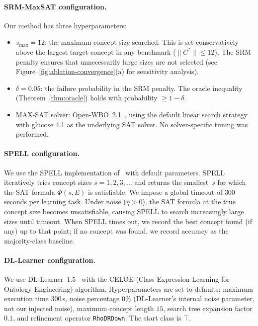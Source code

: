 \documentclass[accepted]{uai2026} %
\theoremstyle{definition}
\theoremstyle{remark}
\begin{document}
\paragraph{SRM-MaxSAT configuration.}
Our method has three hyperparameters:
\begin{itemize}[leftmargin=*,itemsep=1pt]
  \item $s_{\max} = 12$: the maximum concept size searched.
    This is set conservatively above the largest target
    concept in any benchmark ($\|C^*\| \leq 12$).
    The SRM penalty ensures that unnecessarily large sizes
    are not selected
    (see Figure~\ref{fig:ablation-convergence}(a) for
    sensitivity analysis).
  \item $\delta = 0.05$: the failure
    probability in the
    SRM penalty.  The oracle inequality
    (Theorem~\ref{thm:oracle}) holds with probability
    $\geq 1 - \delta$.
  \item MAX-SAT solver: Open-WBO~2.1~\citep{DBLP:conf/sat/MartinsML14},
    using the default linear search strategy with glucose
    4.1 as the underlying SAT solver.  No solver-specific
    tuning was performed.
\end{itemize}

\paragraph{SPELL configuration.}
We use the SPELL implementation
of~\citet{DBLP:conf/ijcai/CateFJL23} with default
parameters.  SPELL iteratively tries concept sizes
$s = 1, 2, 3, \ldots$ and returns the smallest~$s$
for which the SAT formula $\Phi(s, E)$ is satisfiable.
We impose a global timeout of $300$ seconds per
learning task.  Under noise ($\eta > 0$), the SAT formula
at the true concept size becomes unsatisfiable, causing
SPELL to search increasingly large sizes until timeout.
When SPELL times out, we record the best concept found
(if any) up to that point; if no concept was found, we
record accuracy as the majority-class baseline.

\paragraph{DL-Learner configuration.}
We use DL-Learner~1.5~\citep{DBLP:journals/ml/LehmannH10}
with the CELOE (Class Expression Learning for Ontology
Engineering) algorithm.  Hyperparameters are set to
defaults: maximum execution time $300$\,s, noise
percentage $0\%$ (DL-Learner's internal noise parameter,
not our injected noise), maximum concept length $15$,
search tree expansion factor $0.1$,  and refinement
operator \texttt{RhoDRDown}.  The start class is $\top$.
\end{document}
